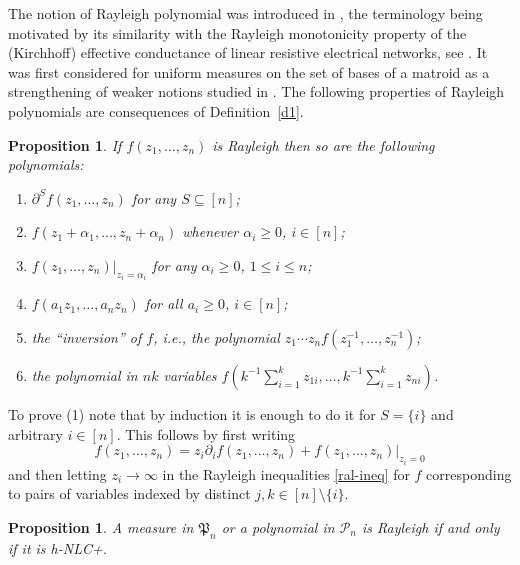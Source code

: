 \documentclass[10pt,reqno]{amsart}
\theoremstyle{plain}
\newtheorem{proposition}[theorem]{Proposition}
\theoremstyle{definition}
\theoremstyle{remark}
\newcommand{\PP}{\mathcal{P}}
\newcommand{\al}{\alpha}
\newcommand{\fP}{\mathfrak{P}}
\newcommand{\pa}{\partial}
\begin{document}
 
The notion of Rayleigh polynomial was introduced in \cite[\S 3.1]{W}, the 
terminology being motivated by its similarity with the Rayleigh monotonicity 
property of 
the (Kirchhoff) effective conductance of linear resistive electrical networks,  
see \cite{CW,W2}. It was first considered for uniform measures on the set of bases of a matroid \cite{CW} as a strengthening of weaker notions studied in \cite{feder,seymour-welsh}. 
The following properties of
Rayleigh polynomials are consequences of Definition~\ref{d1}.
\begin{proposition}\label{p-proper}
If $f(z_1,\ldots,z_n)$ is Rayleigh then so are the following polynomials:
\begin{enumerate}
\item $\pa^S f(z_1,\ldots,z_n)$ for any $S\subseteq [n]$;
\item $f(z_1+\al_1,\ldots,z_n+\al_n)$ whenever $\al_i\ge 0$, $i\in [n]$;
\item $f(z_1,\ldots,z_n)|_{z_i=\al_i}$ for any $\al_i\ge 0$, $1\le i\le n$; 
\item $f(a_1z_1,\ldots,a_nz_n)$ for all $a_i\ge 0$, $i\in [n]$;
\item the ``inversion'' of $f$, i.e., the polynomial 
$z_1\cdots z_nf(z_1^{-1},\ldots,z_n^{-1})$;
\item the polynomial in $nk$ variables 
$f\!\left(k^{-1}\sum_{i=1}^k z_{1i},\ldots,k^{-1}\sum_{i=1}^k z_{ni}\right)$.
\end{enumerate}
\end{proposition}

To prove (1) note that by induction it is enough to do it for $S=\{i\}$ and
arbitrary $i\in [n]$. This follows by first writing 
$$f(z_1,\ldots,z_n)=z_i\pa_i f(z_1,\ldots,z_n)+f(z_1,\ldots,z_n)|_{z_i=0}$$
and then letting $z_i\to\infty$ in the Rayleigh inequalities \eqref{ral-ineq}
for $f$ corresponding to pairs of 
variables indexed by distinct $j,k\in [n]\setminus \{i\}$.

\begin{proposition}\label{p-r-h}
A measure in $\fP_n$ or a polynomial in $\PP_n$ is Rayleigh
if and only if it is h-NLC+.
\end{proposition}
\end{document}
